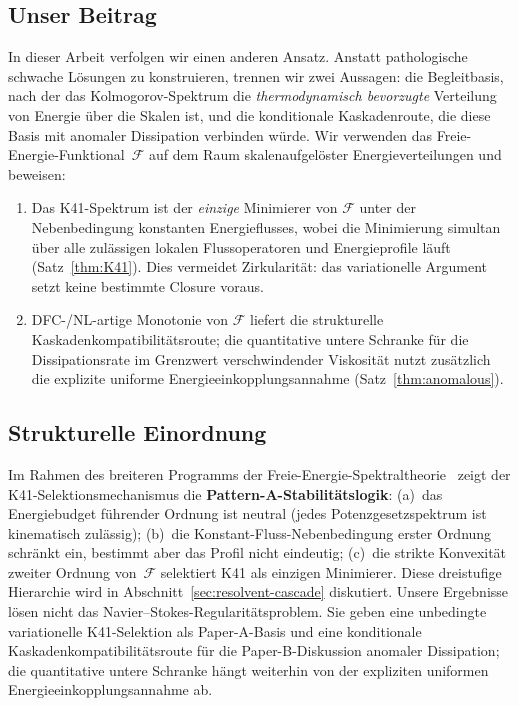 \documentclass[12pt,a4paper]{article}
\theoremstyle{breakdef}
\theoremstyle{breakplain}
\theoremstyle{breakdef}
\begin{document}
\subsection{Unser Beitrag}

In dieser Arbeit verfolgen wir einen anderen Ansatz. Anstatt pathologische
schwache Lösungen zu konstruieren, trennen wir zwei Aussagen: die
Begleitbasis, nach der das Kolmogorov-Spektrum die
\emph{thermodynamisch bevorzugte} Verteilung von Energie über die Skalen
ist, und die konditionale Kaskadenroute, die diese Basis mit anomaler
Dissipation verbinden würde. Wir verwenden das
Freie-Energie-Funktional~$\mathcal{F}$ auf dem Raum skalenaufgelöster
Energieverteilungen und beweisen:
\begin{enumerate}
  \item Das K41-Spektrum ist der \emph{einzige} Minimierer von $\mathcal{F}$
        unter der Nebenbedingung konstanten Energieflusses, wobei die
        Minimierung simultan über alle zulässigen lokalen Flussoperatoren
        und Energieprofile läuft (Satz~\ref{thm:K41}). Dies vermeidet
        Zirkularität: das variationelle Argument setzt keine bestimmte
        Closure voraus.
  \item DFC-/NL-artige Monotonie von $\mathcal{F}$ liefert die strukturelle
        Kaskadenkompatibilitätsroute; die quantitative untere Schranke für
        die Dissipationsrate im Grenzwert verschwindender Viskosität nutzt
        zusätzlich die explizite uniforme Energieeinkopplungsannahme
        (Satz~\ref{thm:anomalous}).
\end{enumerate}

\subsection{Strukturelle Einordnung}

Im Rahmen des breiteren Programms der Freie-Energie-Spektraltheorie~\cite{FST-Unified2026}
zeigt der K41-Selektionsmechanismus die \textbf{Pattern-A-Stabilitätslogik}:
(a)~das Energiebudget führender Ordnung ist neutral (jedes
Potenzgesetzspektrum ist kinematisch zulässig); (b)~die
Konstant-Fluss-Nebenbedingung erster Ordnung schränkt ein, bestimmt aber
das Profil nicht eindeutig; (c)~die strikte Konvexität zweiter Ordnung
von~$\mathcal{F}$ selektiert K41 als einzigen Minimierer. Diese
dreistufige Hierarchie wird in Abschnitt~\ref{sec:resolvent-cascade}
diskutiert.
Unsere Ergebnisse lösen nicht das Navier--Stokes-Regularitätsproblem. Sie
geben eine unbedingte variationelle K41-Selektion als Paper-A-Basis und
eine konditionale Kaskadenkompatibilitätsroute für die Paper-B-Diskussion
anomaler Dissipation; die quantitative untere Schranke hängt weiterhin von
der expliziten uniformen Energieeinkopplungsannahme ab.
\end{document}
